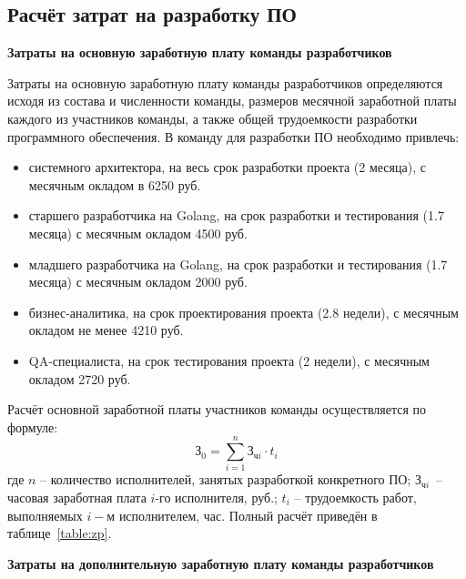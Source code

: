 \subsection{Расчёт затрат на разработку ПО}

\textbf{Затраты на основную заработную плату команды разработчиков}

Затраты на основную заработную плату команды разработчиков определяются исходя из состава и численности команды, размеров месячной заработной платы каждого из участников команды, а также общей трудоемкости разработки программного обеспечения. В команду для разработки ПО необходимо привлечь:
\begin{itemize}
    \item системного архитектора, на весь срок разработки проекта (2 месяца), с месячным окладом в 6250 руб.
    \item старшего разработчика на Golang, на срок разработки и тестирования (1.7 месяца) с месячным окладом 4500 руб.
    \item младшего разработчика на Golang, на срок разработки и тестирования (1.7 месяца) с месячным окладом 2000 руб.
    \item бизнес-аналитика, на срок проектирования проекта (2.8 недели), с месячным окладом не менее 4210 руб.
    \item QA-специалиста, на срок тестирования проекта (2 недели), с месячным окладом 2720 руб.
\end{itemize}

Расчёт основной заработной платы участников команды осуществляется по формуле:
\begin{equation}
    \textit{З}_0 = \sum^{n}_{i=1} \textit{З}_{\textit{ч}i} \cdot t_i 
\end{equation}
где $n$ – количество исполнителей, занятых разработкой конкретного ПО; $\textit{З}_{\textit{ч}i}$ – часовая заработная плата $i$-го исполнителя, руб.; $t_i$ – трудоемкость работ, выполняемых $i-м$ исполнителем, час. Полный расчёт приведён в таблице~\ref{table:zp}.

\textbf{Затраты на дополнительную заработную плату команды разработчиков}

